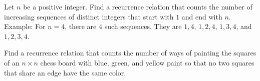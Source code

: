 \begin{prob}
Let $n$ be a positive integer. Find a recurrence relation that counts the number of increasing sequences of distinct integers that start with $1$ and end with $n$. Example: For $n = 4$, there are $4$ such sequences. They are $1,4$, $1,2,4$, $1,3,4$, and $1,2,3,4$.
\end{prob}

\begin{prob}
Find a recurrence relation that counts the number of ways of painting the squares of an $n\times n$ chess board  with blue, green, and yellow paint so that no two squares that share an edge have the same color.
\end{prob}